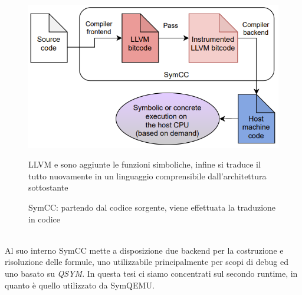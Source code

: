 \documentclass[Lau, oneside]{sapthesis}%
\begin{document}
\begin{figure}[h]
    \centering
    \includegraphics[width=0.59\linewidth]{foto/flusso_symcc.png}
    \caption{SymCC: partendo dal codice sorgente, viene effettuata la traduzione in codice} {LLVM e sono aggiunte le funzioni simboliche, infine si traduce il tutto nuovamente} {in un linguaggio comprensibile dall'architettura sottostante                                 }    \label{fig:flusso_symcc}
\end{figure}
\ \\ \newline
Al suo interno SymCC mette a disposizione due backend per la costruzione e risoluzione delle formule, uno utilizzabile principalmente per scopi di debug ed uno basato su \textit{QSYM}. In questa tesi ci siamo concentrati sul secondo runtime, in quanto è quello utilizzato da SymQEMU.
\end{document}
